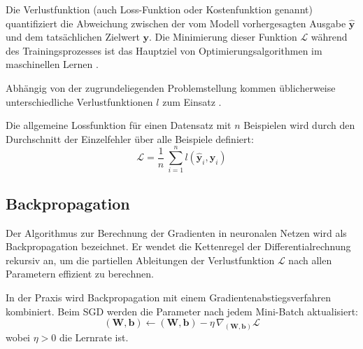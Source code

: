 Die Verlustfunktion (auch Loss-Funktion oder Kostenfunktion genannt) quantifiziert die Abweichung zwischen der vom Modell vorhergesagten Ausgabe $\mathbf{\hat{y}}$ und dem tatsächlichen Zielwert $\mathbf{y}$. Die Minimierung dieser Funktion $\mathcal{L}$ während des Trainingsprozesses ist das Hauptziel von Optimierungsalgorithmen im maschinellen Lernen \autocite{Goodfellow2016}.

Abhängig von der zugrundeliegenden Problemstellung kommen üblicherweise unterschiedliche Verlustfunktionen $l$ zum Einsatz \autocite{Bishop2006}.

Die allgemeine Lossfunktion für einen Datensatz mit $n$ Beispielen wird durch den Durchschnitt der Einzelfehler über alle Beispiele definiert:
\begin{equation}
    \mathcal{L} = \frac{1}{n} \
    \sum_{i=1}^n l\!\left(\mathbf{\hat{y}}_i, \mathbf{y}_i\right)
\end{equation}

\subsection{Backpropagation}

Der Algorithmus zur Berechnung der Gradienten in neuronalen Netzen wird als
Backpropagation bezeichnet. Er wendet die Kettenregel der Differentialrechnung rekursiv an,
um die partiellen Ableitungen der Verlustfunktion $\mathcal{L}$ nach allen Parametern
effizient zu berechnen.

In der Praxis wird Backpropagation mit einem Gradientenabstiegsverfahren kombiniert.
Beim \ac{SGD} werden
die Parameter nach jedem Mini-Batch aktualisiert:
\begin{equation}
    (\mathbf{W}, \mathbf{b}) \leftarrow (\mathbf{W}, \mathbf{b}) - \eta \, \nabla_{(\mathbf{W}, \mathbf{b})} \mathcal{L}
\end{equation}
wobei $\eta > 0$ die Lernrate ist.

